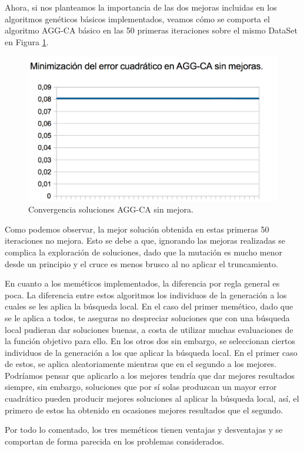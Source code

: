 \documentclass{article}
\begin{document}
	Ahora, si nos planteamos la importancia de las dos mejoras incluidas en los algoritmos genéticos básicos implementados, veamos cómo se comporta el algoritmo AGG-CA básico en las 50 primeras iteraciones sobre el mismo DataSet en Figura \ref{fig:aggcano}. 
	
	
	\begin{figure}[H]
		\centering
		\includegraphics[width=0.7\linewidth]{aggca-nomejora}
		\caption{Convergencia soluciones AGG-CA sin mejora.}
		\label{fig:aggcano}
	\end{figure}

	Como podemos observar, la mejor solución obtenida en estas primeras 50 iteraciones no mejora. Esto se debe a que, ignorando las mejoras realizadas se complica la exploración de soluciones, dado que la mutación es mucho menor desde un principio y el cruce es menos brusco al no aplicar el truncamiento. 
	
	En cuanto a los meméticos implementados, la diferencia por regla general es poca. La diferencia entre estos algoritmos los individuos de la generación a los cuales se les aplica la búsqueda local. En el caso del primer memético, dado que se le aplica a todos, te aseguras no despreciar soluciones que con una búsqueda local pudieran dar soluciones buenas, a costa de utilizar muchas evaluaciones de la función objetivo para ello. En los otros dos sin embargo, se seleccionan ciertos individuos de la generación a los que aplicar la búsqueda local. En el primer caso de estos, se aplica aleatoriamente mientras que en el segundo a los mejores. Podríamos pensar que aplicarlo a los mejores tendría que dar mejores resultados siempre, sin embargo, soluciones que por sí solas produzcan un mayor error cuadrático pueden producir mejores soluciones al aplicar la búsqueda local, así, el primero de estos ha obtenido en ocasiones mejores resultados que el segundo.
	
	Por todo lo comentado, los tres meméticos tienen ventajas y desventajas y se comportan de forma parecida en los problemas considerados.
	
\end{document}
